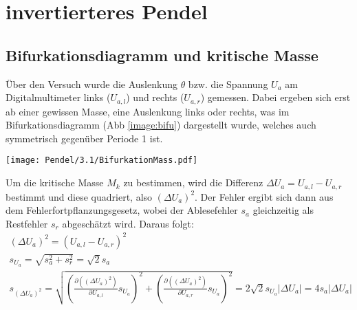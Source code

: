 

\section{invertierteres Pendel}
\label{sec:auswertungPendel}

\subsection{Bifurkationsdiagramm und kritische Masse}
\label{sub:bifuAndKritMass}
Über den Versuch wurde die Auslenkung $\theta$ bzw. die Spannung $U_a$ am Digitalmultimeter links ($U_{a,l}$) und rechts ($U_{a,r}$) gemessen. Dabei ergeben sich erst ab einer gewissen Masse, eine Auslenkung links oder rechts, was im Bifurkationsdiagramm (Abb \ref{image:bifu}) dargestellt wurde, welches auch symmetrisch gegenüber Periode 1 ist.
\begin{center}
    \texttt{[image: Pendel/3.1/BifurkationMass.pdf]}
    \label{image:bifu}
\end{center}
Um die kritische Masse $M_k$ zu bestimmen, wird die Differenz $\Delta U_a=U_{a,l}-U_{a,r}$ bestimmt und diese quadriert, also $(\Delta U_a)^2$. Der Fehler ergibt sich dann aus dem Fehlerfortpflanzungsgesetz, wobei der Ablesefehler $s_a$ gleichzeitig als Restfehler $s_r$ abgeschätzt wird. Daraus folgt:
\begin{gather}
    (\Delta U_a)^2 = (U_{a,l}-U_{a,r})^2\\
    s_{U_a}=\sqrt{s_a^2+s_r^2}=\sqrt{2}s_a\\[0,5cm]
    s_{(\Delta U_a)^2}=\sqrt{\left(\frac{\partial((\Delta U_a)^2)}{\partial U_{a,l}}s_{U_a}\right)^2 + \left(\frac{\partial((\Delta U_a)^2)}{\partial U_{a,r}}s_{U_a}\right)^2}=2\sqrt{2}s_{U_a}|\Delta U_a|=4s_a |\Delta U_a|
\end{gather}
